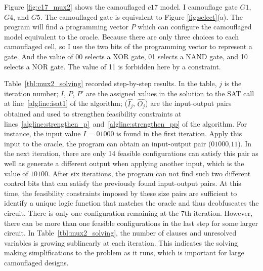 \documentclass[thesis]{umassthesis}  %
\begin{document}
Figure \ref{fig:c17_mux2} shows the camouflaged $c17$ model. I camouflage gate $G1$, $G4$, and $G5$. The camouflaged gate is equivalent to Figure \ref{fig:select}(a). The program will find a programming vector $P$ which can configure the camouflaged model equivalent to the oracle. Because there are only three choices to each camouflaged cell, so I use the two bits of the programming vector to represent a gate. And the value of 00 selects a XOR gate, 01 selects a NAND gate, and 10 selects a NOR gate. The value of 11 is forbidden here by a constraint.


Table~\ref{tbl:mux2_solving} recorded step-by-step results. In the table, $j$ is the iteration number; $I$, $P$, $P'$ are the assigned values in the solution to the SAT call at line~\ref{algline:isat1} of the algorithm; ($\hat{I_{j}}$, $\hat{O_{j}}$) are the input-output pairs obtained and used to strengthen feasibility constraints at lines~\ref{algline:strengthen_p}~and~\ref{algline:strengthen_pp} of the algorithm. For instance, the input value $I$ = $01000$ is found in the first iteration. Apply this input to the oracle, the program can obtain an input-output pair ($01000$,$11$). In the next iteration, there are only 14 feasible configurations can satisfy this pair as well as generate a different output when applying another input, which is the value of $10100$. After six iterations, the program can not find such two different control bits that can satisfy the previously found input-output pairs. At this time, the feasibility constraints imposed by these size pairs are sufficient to identify a unique logic function that matches the oracle and thus deobfuscates the circuit. There is only one configuration remaining at the 7th iteration. However, there can be more than one feasible configurations in the last step for some larger circuit. In Table~\ref{tbl:mux2_solving}, the number of clauses and unresolved variables is growing sublinearly at each iteration. This indicates the solving making simplifications to the problem as it runs, which is important for large camouflaged designs.
\end{document}
